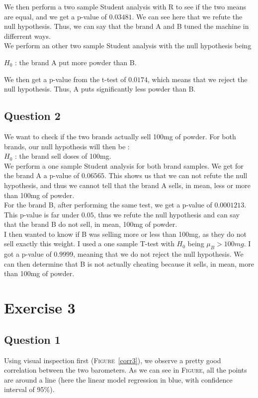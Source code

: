 \documentclass[12pt,a4paper]{article}
\begin{document}
We then perform a two sample Student analysis with R to see if the two means are equal, and we get a p-value of $0.03481$. We can see here that we refute the null hypothesis. Thus, we can say that the brand A and B tuned the machine in differrent ways.\\

We perform an other two sample Student analysis with the null hypothesis being \begin{center}$H_0$ : the brand A put more powder than B.\end{center}
We then get a p-value from the t-test of $0.0174$, which means that we reject the null hypothesis. Thus, A puts significantly less powder than B.

\subsection*{Question 2}
We want to check if the two brands actually sell 100mg of powder. For both brands, our null hypothesis will then be :\\
$H_0$ : the brand sell doses of 100mg.\\
We perform a one sample Student analysis for both brand samples. We get for the brand A a p-value of $0.06565$. This shows us that we can not refute the null hypothesis, and thus we cannot tell that the brand A sells, in mean, less or more than 100mg of powder.\\
For the brand B, after performing the same test, we get a p-value of $0.0001213$. This p-value is far under $0.05$, thus we refute the null hypothesis and can say that the brand B do not sell, in mean, 100mg of powder.\\

I then wanted to know if B was selling more or less than 100mg, as they do not sell exactly this weight. I used a one sample T-test with $H_0$ being $\mu_B > 100mg$. I got a p-value of $0.9999$, meaning that we do not reject the null hypothesis. We can then determine that B is not actually cheating because it sells, in mean, more than 100mg of powder.

\section*{Exercise 3}
\subsection*{Question 1}
Using visual inspection first (\textsc{Figure}~\ref{corr3}), we observe a pretty good correlation between the two barometers. As we can see in \textsc{Figure}, all the points are around a line (here the linear model regression in blue, with confidence interval of 95\%).\\
\end{document}

